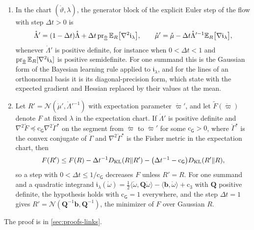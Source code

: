 \begin{enumerate}
\item[(d)] In the chart $(\mathring\vartheta,\lambda)$, the generator block of the explicit Euler step
of the flow with step $\Delta t>0$ is
\begin{equation}
\mathring\Lambda'=(1-\Delta t)\mathring\Lambda+\Delta t\operatorname{pr}_{\mathring\Xi}\mathbb E_R\bigl[\nabla^2\mathfrak i_\lambda\bigr],
\qquad
\mathring\mu'=\mathring\mu-\Delta t\mathring\Lambda'^{-1}\mathbb E_R\bigl[\nabla\mathfrak i_\lambda\bigr],
\label{eq:link-blr}
\end{equation}
whenever $\mathring\Lambda'$ is positive definite, for instance when $0<\Delta t<1$ and
$\operatorname{pr}_{\mathring\Xi}\mathbb E_R[\nabla^2\mathfrak i_\lambda]$ is positive semidefinite. For one summand
this is the Gaussian form of the Bayesian learning rule \citep[Eq.~(12)]{KhanRue2023} applied to
$\mathfrak i_\lambda$, and for the lines of an orthonormal basis it is its diagonal-precision form, which
\citet[Sec.~4.2, Eq.~(37)]{KhanRue2023} state with the expected gradient and Hessian replaced by their
values at the mean.
\item[(e)] Let $R'=\mathcal N(\mathring\mu',\mathring\Lambda'^{-1})$ with expectation parameter
$\mathring\varpi'$, and let $\widetilde F(\mathring\varpi)$ denote $F$ at fixed $\lambda$ in the
expectation chart. If $\mathring\Lambda'$ is positive definite and
$\nabla^2\widetilde F\preceq\mathrm c_{\mathsf G}\nabla^2\mathring\Gamma^\star$ on the segment from
$\mathring\varpi$ to $\mathring\varpi'$ for some $\mathrm c_{\mathsf G}>0$, where
$\mathring\Gamma^\star$ is the convex conjugate of $\mathring\Gamma$ and $\nabla^2\mathring\Gamma^\star$ is
the Fisher metric in the expectation chart, then
\begin{equation}
F(R')\leq F(R)-\Delta t^{-1}D_{\mathrm{KL}}(R\Vert R')-\bigl(\Delta t^{-1}-\mathrm c_{\mathsf G}\bigr)D_{\mathrm{KL}}(R'\Vert R),
\label{eq:link-blr-descent}
\end{equation}
so a step with $0<\Delta t\leq1/\mathrm c_{\mathsf G}$ decreases $F$ unless $R'=R$. For one summand
and a quadratic integrand
$\mathfrak i_\lambda(\mathring\omega)=\tfrac12\langle\mathring\omega,\mathbf Q\mathring\omega\rangle-\langle\mathbf b,\mathring\omega\rangle+\mathrm c_3$
with $\mathbf Q$ positive definite, the hypothesis holds with $\mathrm c_{\mathsf G}=1$ everywhere, and
the step $\Delta t=1$ gives $R'=\mathcal N(\mathbf Q^{-1}\mathbf b,\mathbf Q^{-1})$, the minimizer of $F$
over Gaussian $R$.
\end{enumerate}

The proof is in \cref{sec:proofs-links}.

